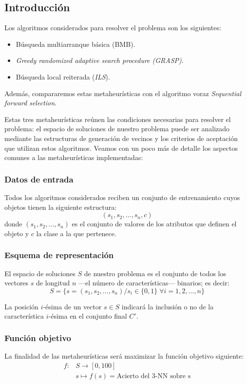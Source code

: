 \documentclass[a4paper, 11pt, titlepage]{article}
\begin{document}
    \subsection{Introducción}

    Los algoritmos considerados para resolver el problema son los siguientes:
    \begin{itemize}
        \item Búsqueda multiarranque básica (BMB).
        \item \emph{Greedy randomized adaptive search procedure (GRASP)}.
        \item Búsqueda local reiterada (\emph{ILS}).
    \end{itemize}

    Además, compararemos estas metaheurísticas con el algoritmo voraz \emph{Sequential forward selection}.

    Estas tres metaheurísticas reúnen las condiciones necesarias para resolver el problema: el espacio de soluciones de nuestro problema puede ser analizado mediante las estructuras de generación de vecinos y los criterios de aceptación que utilizan estos algoritmos. Veamos con un poco más de detalle los aspectos comunes a las metaheurísticas implementadas:

    \subsubsection*{Datos de entrada}
    Todos los algoritmos considerados reciben un conjunto de entrenamiento cuyos objetos tienen la siguiente estructura:
    \[
    (s_1, s_2, \dots, s_n, c)
    \]
    donde $(s_1, s_2, \dots, s_n)$ es el conjunto de valores de los atributos que definen el objeto y $c$ la clase a la que pertenece.

    \subsubsection*{Esquema de representación}
    El espacio de soluciones $S$ de nuestro problema es el conjunto de todos los vectores $s$ de longitud $n$ ---el número de características--- binarios; es decir:
    \[
    S = \{s = (s_1, s_2, \dots, s_n) / s_i \in \{0,1\} \;\forall i = 1, 2, \dots, n\}
    \]

    La posición $i$-ésima de un vector $s \in S$ indicará la inclusión o no de la característica $i$-ésima en el conjunto final $C'$.

    \subsubsection*{Función objetivo}
    La finalidad de las metaheurísticas será maximizar la función objetivo siguiente:
    \begin{align*}
        f \colon &S \to [0,100] \\
        &s \mapsto f(s) = \textrm{Acierto del 3-NN sobre s}
    \end{align*}
\end{document}
